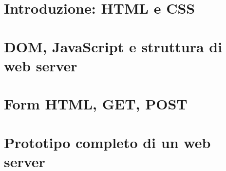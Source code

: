 \section{Introduzione: HTML e CSS}

%

\section{DOM, JavaScript e struttura di web server}

%

\section{Form HTML, GET, POST}

%

\section{Prototipo completo di un web server}